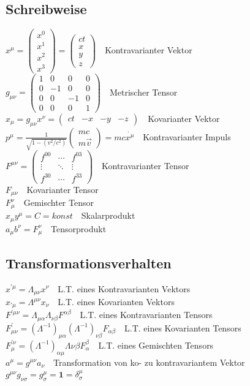 \documentclass[8pt,a4paper]{extarticle}
\newcommand{\frml}[2]{$#1$~\hfill~#2\\}
\begin{document}
\begin{multicols}{3}
\subsection{Schreibweise}
\frml{x^\mu = \begin{pmatrix} x^0 \\ x^1 \\ x^2 \\ x^3 \end{pmatrix} = \begin{pmatrix} ct \\ x \\ y \\ z \end{pmatrix}}{Kontravarianter Vektor}
\frml{g_{\mu \nu} = \begin{pmatrix} 1 & 0 & 0 & 0 \\ 0 & -1 & 0 & 0 \\ 0 & 0 & -1 & 0 \\ 0 & 0 & 0 & 1 \end{pmatrix}}{Metrischer Tensor}
\frml{x_\mu = g_{\mu\nu} x^\nu = \begin{pmatrix} ct & -x & -y & -z \end{pmatrix}}{Kovarianter Vektor}
\frml{p^\mu = \frac{1}{\sqrt{1-(v^2/c^2)}}\begin{pmatrix} mc \\ m\vec{v} \end{pmatrix} = mc\dot{x^\mu}}{Kontravarianter Impuls}
\frml{F^{\mu\nu} = \begin{pmatrix} f^{00} & \cdots & f^{03} \\ \vdots & \ddots & \vdots \\ f^{30} & \cdots & f^{33} \end{pmatrix}}{Kontravarianter Tensor}
\frml{F_{\mu\nu}}{Kovarianter Tensor}
\frml{F_\mu^\nu}{Gemischter Tensor}
\frml{x_\mu y^\mu = C = konst}{Skalarprodukt}
\frml{a_\mu b^\nu = F^\nu_\mu}{Tensorprodukt}

\subsection{Transformationsverhalten}
\frml{x^{'\mu} = \Lambda_{\mu\nu}x^\nu}{L.T. eines Kontravarianten Vektors}
\frml{x_{'\mu} = \Lambda^{\mu\nu}x_\nu}{L.T. eines Kovarianten Vektors}
\frml{F^{'\mu\nu} = \Lambda_{\mu\alpha}\Lambda_{\nu\beta}F^{\alpha\beta}}{L.T. eines Kontravarianten Tensors}
\frml{F^{'}_{\mu\nu} = (\Lambda^{-1})_{\mu\alpha}(\Lambda^{-1})_{\nu\beta}F_{\alpha\beta}}{L.T. eines Kovarianten Tensors}
\frml{F^{'\nu}_\mu = (\Lambda^{-1})_{\alpha\mu}\Lambda{\nu\beta} F_\alpha^\beta}{L.T. eines Gemischten Tensors}
\frml{a^\mu = g^{\mu\nu}a_\nu}{Transformation von ko- zu kontravariantem Vektor}
\frml{g^{\mu\nu}g_{\nu\sigma} = g^\mu_\sigma = \mathbf{1} = \delta_\sigma^\mu}{}


\end{multicols}
\end{document}
